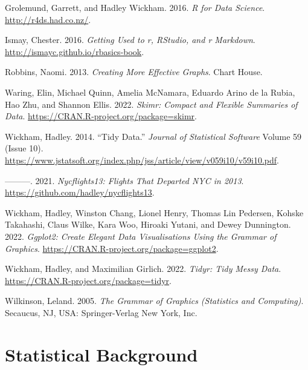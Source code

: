 \documentclass[
  letterpaper,
  DIV=11,
  numbers=noendperiod]{scrreprt}
\newlength{\cslhangindent}
\newlength{\cslentryspacingunit} %
\newenvironment{CSLReferences}[2] %
 {%
  \setlength{\parindent}{0pt}
  \ifodd #1
  \let\oldpar\par
  \def\par{\hangindent=\cslhangindent\oldpar}
  \fi
  \setlength{\parskip}{#2\cslentryspacingunit}
 }%
 {}
\theoremstyle{definition}
\theoremstyle{remark}
\begin{document}
\hypertarget{refs}{}
\begin{CSLReferences}{1}{0}
\leavevmode{}%
Grolemund, Garrett, and Hadley Wickham. 2016. \emph{R for Data Science}.
\url{http://r4ds.had.co.nz/}.

\leavevmode{}%
Ismay, Chester. 2016. \emph{Getting Used to r, {RStudio}, and r
Markdown}. \url{http://ismayc.github.io/rbasics-book}.

\leavevmode{}%
Robbins, Naomi. 2013. \emph{Creating More Effective Graphs}. Chart
House.

\leavevmode{}%
Waring, Elin, Michael Quinn, Amelia McNamara, Eduardo Arino de la Rubia,
Hao Zhu, and Shannon Ellis. 2022. \emph{Skimr: Compact and Flexible
Summaries of Data}. \url{https://CRAN.R-project.org/package=skimr}.

\leavevmode{}%
Wickham, Hadley. 2014. {``Tidy Data.''} \emph{Journal of Statistical
Software} Volume 59 (Issue 10).
\url{https://www.jstatsoft.org/index.php/jss/article/view/v059i10/v59i10.pdf}.

\leavevmode{}%
---------. 2021. \emph{Nycflights13: Flights That Departed NYC in 2013}.
\url{https://github.com/hadley/nycflights13}.

\leavevmode{}%
Wickham, Hadley, Winston Chang, Lionel Henry, Thomas Lin Pedersen,
Kohske Takahashi, Claus Wilke, Kara Woo, Hiroaki Yutani, and Dewey
Dunnington. 2022. \emph{Ggplot2: Create Elegant Data Visualisations
Using the Grammar of Graphics}.
\url{https://CRAN.R-project.org/package=ggplot2}.

\leavevmode{}%
Wickham, Hadley, and Maximilian Girlich. 2022. \emph{Tidyr: Tidy Messy
Data}. \url{https://CRAN.R-project.org/package=tidyr}.

\leavevmode{}%
Wilkinson, Leland. 2005. \emph{The Grammar of Graphics (Statistics and
Computing)}. Secaucus, NJ, USA: Springer-Verlag New York, Inc.

\end{CSLReferences}

\appendix
{}

\hypertarget{sec-stat-background}{%
\chapter{Statistical Background}\label{sec-stat-background}}
\end{document}
